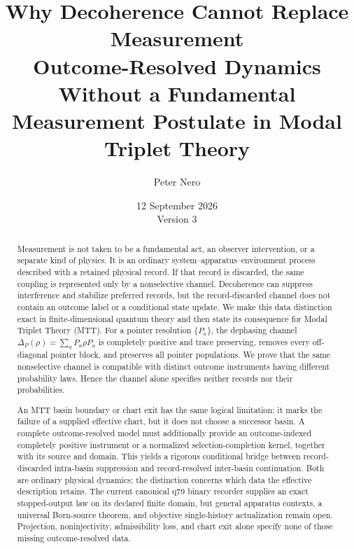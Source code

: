 \documentclass[11pt]{article}
\title{\bf Why Decoherence Cannot Replace Measurement\\
\large Outcome-Resolved Dynamics Without a Fundamental Measurement Postulate
in Modal Triplet Theory}
\author{Peter Nero}
\date{12 September 2026\\Version 3}
\begin{document}
\maketitle

\begin{abstract}
Measurement is not taken to be a fundamental act, an observer intervention,
or a separate kind of physics.  It is an ordinary
system--apparatus--environment process described with a retained physical
record.  If that record is discarded, the same coupling is represented only
by a nonselective channel.  Decoherence can suppress interference and stabilize
preferred records, but the record-discarded channel does not contain an
outcome label or a conditional state update.  We make this data distinction
exact in finite-dimensional quantum theory and then state its consequence for
Modal Triplet Theory (MTT).  For a pointer resolution
$\{P_a\}$, the dephasing channel
$\Delta_P(\rho)=\sum_aP_a\rho P_a$ is completely positive and trace
preserving, removes every off-diagonal pointer block, and preserves all pointer
populations.  We prove that the same nonselective channel is compatible with
distinct outcome instruments having different probability laws.  Hence the
channel alone specifies neither records nor their probabilities.

An MTT basin boundary or chart exit has the same logical limitation: it marks
the failure of a supplied effective chart, but it does not choose a successor
basin.  A complete outcome-resolved model must additionally provide an
outcome-indexed completely positive instrument or a normalized
selection-completion kernel, together with its source and domain.  This yields
a rigorous conditional bridge between record-discarded intra-basin suppression
and record-resolved inter-basin continuation.  Both are ordinary physical
dynamics; the distinction concerns which data the effective description
retains.  The
current canonical q79 binary recorder supplies an exact stopped-output law on
its declared finite domain, but general apparatus contexts, a universal
Born-source theorem, and objective single-history actualization remain open.
Projection, noninjectivity, admissibility loss, and chart exit alone specify
none of those missing outcome-resolved data.
\end{abstract}
\end{document}
